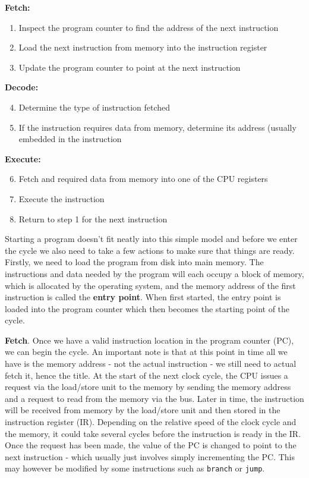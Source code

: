 \documentclass{article}
\begin{document}
	\textbf{Fetch:}
	\begin{enumerate}
		\item Inspect the program counter to find the address of the next instruction
		\item Load the next instruction from memory into the instruction register
		\item Update the program counter to point at the next instruction
	\end{enumerate}
	
	\textbf{Decode:}
	\begin{enumerate}
		\setcounter{enumi}{3}
		\item Determine the type of instruction fetched
		\item If the instruction requires data from memory, determine its address (usually embedded in the instruction
	\end{enumerate}
	
	\textbf{Execute:}
	\begin{enumerate}
		\setcounter{enumi}{5}
		\item Fetch and required data from memory into one of the CPU registers
		\item Execute the instruction
		\item Return to step 1 for the next instruction
	\end{enumerate}
	
	Starting a program doesn't fit neatly into this simple model and before we enter the cycle we also need to take a few actions to make sure that things are ready. Firstly, we need to load the program from disk into main memory. The instructions and data needed by the program will each occupy a block of memory, which is allocated by the operating system, and the memory address of the first instruction is called the \textbf{entry point}. When first started, the entry point is loaded into the program counter which then becomes the starting point of the cycle.
	
	\par 
	\textbf{Fetch}. Once we have a valid instruction location in the program counter (PC), we can begin the cycle. An important note is that at this point in time all we have is the memory address - not the actual instruction - we still need to actual fetch it, hence the title. At the start of the next clock cycle, the CPU issues a request via the load/store unit to the memory by sending the memory address and a request to read from the memory via the bus. Later in time, the instruction will be received from memory by the load/store unit and then stored in the instruction register (IR). Depending on the relative speed of the clock cycle and the memory, it could take several cycles before the instruction is ready in the IR. Once the request  has been made, the value of the PC is changed to point to the next instruction - which usually just involves simply incrementing the PC. This may however be modified by some instructions such as \texttt{branch} or \texttt{jump}.
	
\end{document}
